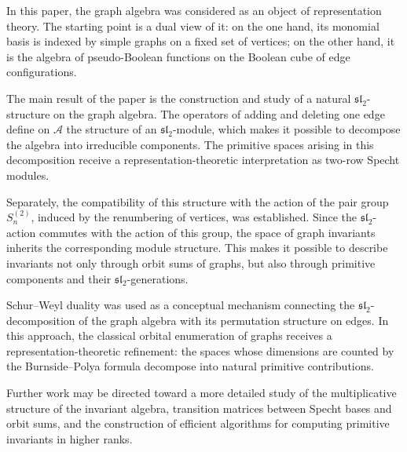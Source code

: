 \documentclass[12pt,reqno]{amsart}
\begin{document}
In this paper, the graph algebra was considered as an object of representation
theory. The starting point is a dual view of it: on the one hand, its monomial
basis is indexed by simple graphs on a fixed set of vertices; on the other
hand, it is the algebra of pseudo-Boolean functions on the Boolean cube of
edge configurations.

The main result of the paper is the construction and study of a natural
\(\mathfrak{sl}_2\)-structure on the graph algebra. The operators of adding
and deleting one edge define on \(\mathcal A\) the structure of an
\(\mathfrak{sl}_2\)-module, which makes it possible to decompose the algebra
into irreducible components. The primitive spaces arising in this
decomposition receive a representation-theoretic interpretation as two-row
Specht modules.

Separately, the compatibility of this structure with the action of the pair
group \(S_n^{(2)}\), induced by the renumbering of vertices, was established.
Since the \(\mathfrak{sl}_2\)-action commutes with the action of this group,
the space of graph invariants inherits the corresponding module structure.
This makes it possible to describe invariants not only through orbit sums of
graphs, but also through primitive components and their
\(\mathfrak{sl}_2\)-generations.

Schur--Weyl duality was used as a conceptual mechanism connecting the
\(\mathfrak{sl}_2\)-decomposition of the graph algebra with its permutation
structure on edges. In this approach, the classical orbital enumeration of
graphs receives a representation-theoretic refinement: the spaces whose
dimensions are counted by the Burnside--Polya formula decompose into natural
primitive contributions.

Further work may be directed toward a more detailed study of the
multiplicative structure of the invariant algebra, transition matrices between
Specht bases and orbit sums, and the construction of efficient algorithms for
computing primitive invariants in higher ranks.
\end{document}
